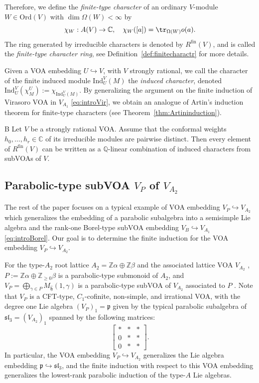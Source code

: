 \documentclass[12pt,a4paper,reqno]{amsart}
\numberwithin{equation}{section}
\numberwithin{equation}{section}
\theoremstyle{definition}
\newcommand{\Z}{\mathbb{Z}}
\newcommand{\Q}{\mathbb{Q}}
\def \ra {\rightarrow}
\def \C {\mathbb{C}}
\def \al{\alpha}
\def\hr{\hookrightarrow}
\def \ga {\gamma}
\def \b {\beta}
\def \op {\oplus}
\def \h {\mathfrak{h}}
\def\Ind{\mathrm{Ind}}
\def\Om{\Omega}
\def\fp{\mathfrak{p}}
\def\Ind{\mathrm{Ind}}
\def\sl{\mathfrak{sl}}
\def\fin{\mathrm{fin}}
\def\Ord{\mathrm{Ord}}
\begin{document}
Therefore, we define the \emph{finite-type character} of an ordinary $V$-module $W\in \Ord(V)$ with $\dim \Om(W)<\infty$ by 
\[
\chi_W:A(V)\ra \C,\quad \chi_W([a])=\tr_{\Om(W)} o(a).
\]
The ring generated by irreducible characters is denoted by $R^{\fin}(V)$, and is called the \emph{finite-type character ring}, see Definition~\ref{def:finitecharactr} for more details. 

Given a VOA embedding $U\hookrightarrow V$, with $V$ strongly rational, we call the character of the finite induced module $\Ind^V_U(M)$ the \emph{induced character}, denoted 
$
\Ind^V_U (\chi^U_M):=\chi_{\Ind^V_U(M)}.
$
By generalizing the argument on the finite induction of Virasoro VOA in $V_{A_1}$ \eqref{eq:introVir}, we obtain an analogue of Artin's induction theorem for finite-type characters (see Theorem~\ref{thm:Artininduction}). 

\begin{customthm}{B}\label{main:BB}
	Let $V$ be a strongly rational VOA. Assume that the conformal weights $h_0,\dots,h_r\in \C$ of its irreducible modules are pairwise distinct. Then every element of $R^{\mathrm{fin}}(V)$ can be written as a $\Q$-linear combination of induced characters from subVOAs of $V$.
\end{customthm}





\subsection{Parabolic-type subVOA $V_P$ of $V_{A_2}$}
The rest of the paper focuses on a typical example of VOA embedding $V_P\hookrightarrow V_{A_2}$ which generalizes the embedding of a parabolic subalgebra into a semisimple Lie algebra and the rank-one Borel-type subVOA embedding $V_B\hr V_{A_1}$ \eqref{eq:introBorel}. Our goal is to determine the finite induction for the VOA embedding $V_P\hr V_{A_2}$. 

For the type-$A_2$ root lattice $A_2=\Z\al\op \Z\b$ and the associated lattice VOA $V_{A_2}$ \cite{FLM}, $P:=\Z\al\op\Z_{\geq 0}\b$ is a parabolic-type submonoid of $A_2$, and $V_P=\bigoplus_{\ga\in P}M_{\hat{\h}}(1,\ga)$ is a parabolic-type subVOA of $V_{A_2}$ associated to $P$ \cite[Definition 3.4]{Liu24}. Note that $V_P$ is a CFT-type, $C_1$-cofinite, non-simple, and irrational VOA, with the degree one Lie algebra $(V_P)_1=\fp$ given by the typical parabolic subalgebra of $\sl_3=(V_{A_2})_1$ spanned by the following matrices:
$$
\begin{bmatrix}
	\ast &\ast &\ast \\
	0&\ast &\ast\\
	0&\ast &\ast
\end{bmatrix}.
$$
In particular, the VOA embedding $V_P\hookrightarrow V_{A_2}$ generalizes the Lie algebra embedding $\fp\hookrightarrow \sl_3$, and the finite induction with respect to this VOA embedding generalizes the lowest-rank parabolic induction of the type-$A$ Lie algebras.
\end{document}
